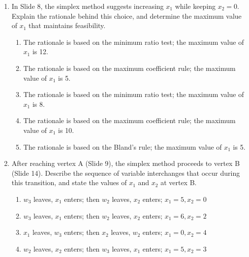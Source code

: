 \documentclass{article}%
\begin{document}
\begin{enumerate}
\begin{enumerate}
\begin{enumerate}%
\item $ x_1 = 0, x_2 = 0, w_1 = 12, w_2 = 8, w_3 = 10; \zeta = 0 $%
\item $ x_1 = 12, x_2 = 8, w_1 = 0, w_2 = 0, w_3 = 0; \zeta = 52 $%
\item $ x_1 = 5, x_2 = 0, w_1 = 17, w_2 = 3, w_3 = 0; \zeta = 15 $%
\item $ x_1 = 6, x_2 = 2, w_1 = 0, w_2 = 0, w_3 = 0; \zeta = 22 $%
\item $ x_1 = 0, x_2 = 4, w_1 = 0, w_2 = 4, w_3 = 14; \zeta = 8 $%
\end{enumerate}%
\vspace{0.5em}%
\item In Slide 8, the simplex method suggests increasing $ x_1 $ while keeping $ x_2 = 0 $.  Explain the rationale behind this choice, and determine the maximum value of $ x_1 $ that maintains feasibility.%
\begin{enumerate}%
\item The rationale is based on the minimum ratio test; the maximum value of $ x_1 $ is 12.%
\item The rationale is based on the maximum coefficient rule; the maximum value of $ x_1 $ is 5.%
\item The rationale is based on the minimum ratio test; the maximum value of $ x_1 $ is 8.%
\item The rationale is based on the maximum coefficient rule; the maximum value of $ x_1 $ is 10.%
\item The rationale is based on the Bland's rule; the maximum value of $ x_1 $ is 5.%
\end{enumerate}%
\vspace{0.5em}%
\item After reaching vertex A (Slide 9), the simplex method proceeds to vertex B (Slide 14). Describe the sequence of variable interchanges that occur during this transition, and state the values of $ x_1 $ and $ x_2 $ at vertex B.%
\begin{enumerate}%
\item $ w_3 $ leaves, $ x_1 $ enters; then $ w_2 $ leaves, $ x_2 $ enters; $ x_1 = 5, x_2 = 0 $%
\item $ w_3 $ leaves, $ x_1 $ enters; then $ w_2 $ leaves, $ x_2 $ enters; $ x_1 = 6, x_2 = 2 $%
\item $ x_1 $ leaves, $ w_3 $ enters; then $ x_2 $ leaves, $ w_2 $ enters; $ x_1 = 0, x_2 = 4 $%
\item $ w_2 $ leaves, $ x_2 $ enters; then $ w_3 $ leaves, $ x_1 $ enters; $ x_1 = 5, x_2 = 3 $%

\end{enumerate}
\end{enumerate}
\end{enumerate}
\end{document}
